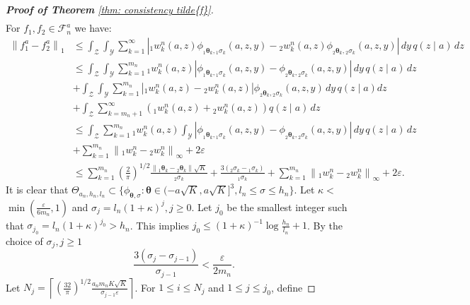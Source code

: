 \begin{proof}[\hypertarget{proof of thm consistency f tilde}{\textbf{Proof of Theorem}} \ref{thm: consistency tilde{f}}]
$$\begin{aligned}
    \end{aligned}
    $$
    For $f_1, f_2 \in \mathcal{F}^a_n$ we have:
    \begin{align*}
    \left\|f^a_1-f^a_2\right\|_1 & \leq \int_{\mathcal{Z}} \int_{\mathcal{Y}} \sum_{k=1}^{\infty}\left| {}_{1}w^n_k(a,z) \phi_{{}_{1}\boldsymbol{\theta}_k, {}_{1}\sigma_k}(a,z,y)-  {}_{2}w^n_k(a,z) \phi_{{}_{2}\boldsymbol{\theta}_k, {}_{2}\sigma_k}(a,z,y)\right| \, d y \, q(z \mid a) \,  d z \\
    & \leq \int_{\mathcal{Z}} \int_{\mathcal{Y}} \sum_{k=1}^{m_n} {}_{1}w^n_k(a,z) \left| \phi_{{}_{1}\boldsymbol{\theta}_k, {}_{1}\sigma_k}(a,z,y)- \phi_{{}_{2}\boldsymbol{\theta}_k, {}_{2}\sigma_k}(a,z,y)\right| \, d y \, q(z \mid a) \,  d z \\
    & +\int_{\mathcal{Z}} \int_{\mathcal{Y}} \sum_{k=1}^{m_n}\left|{}_{1}w^n_k(a,z) - {}_{2}w^n_k(a,z)\right| \phi_{{}_{2}\boldsymbol{\theta}_k, {}_{2}\sigma_k}(a,z,y) \, d y \, q(z \mid a) d z \\
    & +\int_{\mathcal{Z}} \sum_{k=m_n+1}^{\infty} \left( {}_{1}w^n_k(a,z)+ {}_{2}w_k^n(a,z)\right) q(z \mid a)  \, d z \\
    & \leq \int_{\mathcal{Z}} \sum_{k=1}^{m_n} {}_{1}w^n_k(a,z) \int_{\mathcal{Y}} \left|\phi_{{}_{1}\boldsymbol{\theta}_k, {}_{1}\sigma_k}(a,z, y)-\phi_{{}_{2}\boldsymbol{\theta}_k, {}_{2}\sigma_k}(a,z, y)\right| \, d y \, q(z \mid a) \, d z \\
    & +\sum_{k=1}^{m_n}\left\|{}_{1}w^n_k - {}_{2}w^n_k \right\|_\infty+ 2\varepsilon \\
    & \leq \sum_{k=1}^{m_n} \left(\frac{2}{\pi}\right)^{1 / 2} \frac{\left\| {}_{1}\boldsymbol{\theta}_k - {}_{2}\boldsymbol{\theta}_k \right\| \sqrt{K}}{{}_{2}\sigma_k}+\frac{3\left({}_{2}\sigma_k-{}_{1}\sigma_k \right)}{{}_{1}\sigma_k}  +\sum_{k=1}^{m_n}\left\|{}_{1}w^n_k - {}_{2}w^n_k \right\|_\infty+ 2\varepsilon.
    \end{align*}
    It is clear that $\Theta_{a_n, h_n, l_n} \subset\{\phi_{\boldsymbol{\theta}, \sigma}: \boldsymbol{\theta} \in(-a \sqrt{K}, a \sqrt{K}]^3, l_n \leq \sigma \leq h_n \}$. Let $\kappa<$ $\min (\frac{\varepsilon}{6 m_n }, 1)$ and $\sigma_j=l_n(1+\kappa)^j, j \geq 0$. Let $j_0$ be the smallest integer such that $\sigma_{j_0}=l_n(1+\kappa)^{j_0}>h_n$. This implies $j_0 \leq(1+\kappa)^{-1} \log \frac{h_n}{l_n}+1$. By the choice of $\sigma_j, j \geq 1$ 
    $$\frac{3\left(\sigma_j-\sigma_{j-1}\right)}{\sigma_{j-1}}<\frac{\varepsilon}{2m_n}.$$ 
    Let $N_j=\left\lceil\left(\frac{32}{\pi}\right)^{1 / 2} \frac{a_n m_n K \sqrt{K}}{\sigma_{j-1} \varepsilon}\right\rceil$. For $1 \leq i \leq N_j$ and $1 \leq j \leq j_0$, define

\end{proof}

